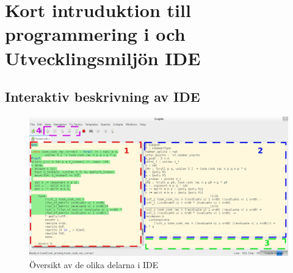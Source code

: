 \section{Kort intruduktion till programmering i \coq och
Utvecklingsmiljön \coq IDE}

\subsection{Interaktiv beskrivning av \coq IDE}

\begin{figure}[H]
  \centering
  \includegraphics[width=\textwidth]{images/Overview}
  \caption[Översikt av \coq IDE]
   {Översikt av de olika delarna i \coq IDE}
\end{figure}

